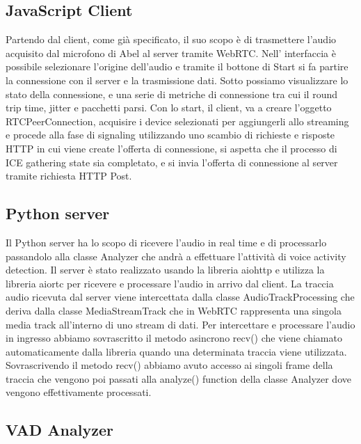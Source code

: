 \documentclass[12pt]{article}
\begin{document}
\subsection{JavaScript Client}

Partendo dal client, come già specificato, il suo scopo è di trasmettere l'audio acquisito dal microfono di Abel al server tramite WebRTC. Nell' interfaccia è possibile selezionare l'origine dell'audio e tramite il bottone di Start si fa partire la connessione con il server e la trasmissione dati. Sotto possiamo visualizzare lo stato della connessione, e una serie di metriche di connessione tra cui il round trip time, jitter e pacchetti parsi.
Con lo start, il client, va a creare l'oggetto RTCPeerConnection, acquisire i device selezionati per aggiungerli allo streaming e procede alla fase di signaling utilizzando uno scambio di richieste e risposte HTTP in cui viene create l'offerta di connessione, si aspetta che il processo di ICE gathering state sia completato, e si invia l'offerta di connessione al server tramite richiesta HTTP Post. 

\subsection{Python server}

Il Python server ha lo scopo di ricevere l'audio in real time e di processarlo passandolo alla classe Analyzer che andrà a effettuare l'attività di voice activity detection.
Il server è stato realizzato usando la libreria aiohttp e utilizza la libreria aiortc per ricevere e processare l'audio in arrivo dal client. La traccia audio ricevuta dal server viene intercettata dalla classe AudioTrackProcessing che deriva dalla classe MediaStreamTrack che in WebRTC rappresenta una singola media track all'interno di uno stream di dati. Per intercettare e processare l'audio in ingresso abbiamo sovrascritto il metodo asincrono recv() che viene chiamato automaticamente dalla libreria quando una determinata traccia viene utilizzata. Sovrascrivendo il metodo recv() abbiamo avuto accesso ai singoli frame della traccia che vengono poi passati alla analyze() function della classe Analyzer dove vengono effettivamente processati.

\subsection{VAD Analyzer}
\end{document}
